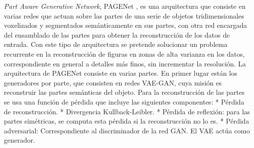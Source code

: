 \documentclass[spanish]{article}
\begin{document}

\textit{Part Aware Generative Network}, PAGENet \cite{Li2019}, es una
arquitectura que consiste en varias redes que actuan sobre las partes
de una serie de objetos tridimensionales voxelizados y segmentados
semánticamente en sus partes, con otra red encargada del ensamblado
de las partes para obtener la reconstrucción de los datos de entrada.
Con este tipo de arquitectura se pretende solucionar un problema
recurrente en la reconstrucción de figuras en zonas de alta varianza
en los datos, correspondiente en general a detalles más finos, sin
incrementar la resolución.
La arquitectura de PAGENet consiste en varias partes. En primer lugar
están los generadores por parte, que consisten en redes VAE-GAN, cuya
misión es reconstruir las partes semánticas del objeto.
Para la reconstrucción de las partes se usa una función de pérdida que
incluye las siguientes componentes:
* Pérdida de reconstrucción.
* Divergencia Kullback-Leibler.
* Pérdida de reflexión: para las partes simétricas, se computa esta
pérdida si la reconstrucción no lo es.
* Pérdida adversarial: Correspondiente al discriminador de la red GAN.
El VAE actúa como generador.

\end{document}
